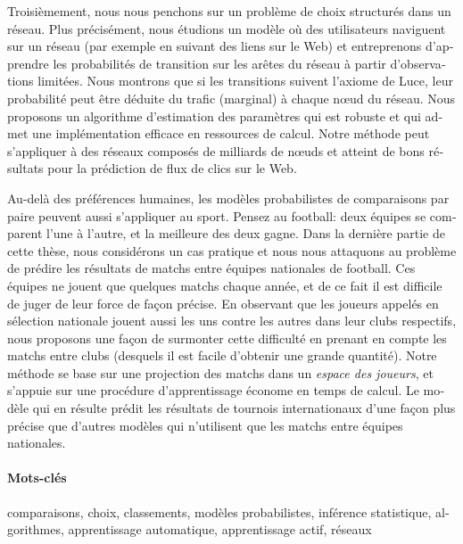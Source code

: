 \begin{otherlanguage}{french}
Troisièmement, nous nous penchons sur un problème de choix structurés dans un réseau.
Plus précisément, nous étudions un modèle où des utilisateurs naviguent sur un réseau (par exemple en suivant des liens sur le Web) et entreprenons d'apprendre les probabilités de transition sur les arêtes du réseau à partir d'observations limitées.
Nous montrons que si les transitions suivent l'axiome de Luce, leur probabilité peut être déduite du trafic (marginal) à chaque nœud du réseau.
Nous proposons un algorithme d'estimation des paramètres qui est robuste et qui admet une implémentation efficace en ressources de calcul.
Notre méthode peut s'appliquer à des réseaux composés de milliards de nœuds et atteint de bons résultats pour la prédiction de flux de clics sur le Web.

Au-delà des préférences humaines, les modèles probabilistes de comparaisons par paire peuvent aussi s'appliquer au sport.
Pensez au football: deux équipes se comparent l'une à l'autre, et la meilleure des deux gagne.
Dans la dernière partie de cette thèse, nous considérons un cas pratique et nous nous attaquons au problème de prédire les résultats de matchs entre équipes nationales de football.
Ces équipes ne jouent que quelques matchs chaque année, et de ce fait il est difficile de juger de leur force de façon précise.
En observant que les joueurs appelés en sélection nationale jouent aussi les uns contre les autres dans leur clubs respectifs, nous proposons une façon de surmonter cette difficulté en prenant en compte les matchs entre clubs (desquels il est facile d'obtenir une grande quantité).
Notre méthode se base sur une projection des matchs dans un \emph{espace des joueurs}, et s'appuie sur une procédure d'apprentissage économe en temps de calcul.
Le modèle qui en résulte prédit les résultats de tournois internationaux d'une façon plus précise que d'autres modèles qui n'utilisent que les matchs entre équipes nationales.

\paragraph{Mots-clés}
comparaisons, choix, classements, modèles probabilistes, inférence statistique, algorithmes, apprentissage automatique, apprentissage actif, réseaux
\end{otherlanguage}
